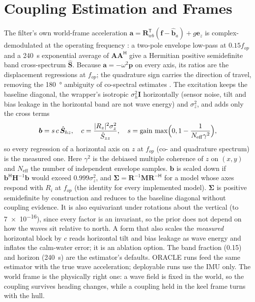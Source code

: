 \documentclass[conference]{IEEEtran}
\DeclareRobustCommand{\vct}[1]{\bm{#1}}
\DeclareRobustCommand{\mat}[1]{\bm{#1}}
\newcommand{\Hr}{^{\mathsf H}}
\theoremstyle{bodysmall}
\begin{document}
\section{Coupling Estimation and Frames}
\label{sec:estimation}
The filter's own world-frame acceleration
$\vct a=\mat R_{wb}^{\mathsf T}(\vct f-\hat{\vct b}_a)+g\vct e_z$ is
complex-demodulated at the operating frequency \cite{bingham67}: a two-pole
envelope low-pass at $0.15f_{op}$ and a \SI{240}{s} exponential average of
$\vct A\vct A\Hr$ give a Hermitian positive semidefinite band cross-spectrum
$\hat{\mat S}$. Because $\vct a=-\omega^2\vct p$ on every axis, its ratios
are the displacement regressions at $f_{op}$; the quadrature sign carries
the direction of travel, removing the \SI{180}{\degree} ambiguity of
co-spectral estimates \cite{longuethiggins63,kuik88}. The excitation keeps
the baseline diagonal, the wrapper's isotropic $\sigma_h^2\mat I$ horizontally
(sensor noise, tilt and bias leakage in the horizontal band are not wave
energy) and $\sigma_z^2$, and adds only the cross terms
\begin{equation}
\vct b=s\,c\,\hat{\mat S}_{hz},\quad c=\frac{|R_z|^2\sigma_z^2}{\hat S_{zz}},\quad
s=\mathrm{gain}\,\max\Bigl(0,1-\frac1{N_{\mathrm{eff}}\gamma^2}\Bigr),
\label{eq:mapping}
\end{equation}
so every regression of a horizontal axis on $z$ at $f_{op}$ (co- and
quadrature spectrum) is the measured one. Here $\gamma^2$ is the debiased
multiple coherence of $z$ on $(x,y)$ and $N_{\mathrm{eff}}$ the number of
independent envelope samples. $\vct b$ is scaled down if
$\vct b\Hr\mat H^{-1}\vct b$ would exceed $0.999\sigma_z^2$, and
$\mat\Sigma=\mat R^{-1}\mat M\mat R^{-\mathsf H}$ for a model whose axes
respond with $R_i$ at $f_{op}$ (the identity for every implemented model). $\mat\Sigma$ is positive
semidefinite by construction and reduces to the baseline diagonal without
coupling evidence. It is also equivariant under rotations about the vertical
(to \num{7e-16}), since every factor is an invariant, so the prior does not
depend on how the waves sit relative to north. A form that also scales the
\emph{measured} horizontal block by $c$ reads horizontal tilt and bias
leakage as wave energy and inflates the calm-water error; it is an ablation
option. The band fraction (0.15) and horizon (\SI{240}{s}) are the
estimator's defaults. ORACLE runs feed the same
estimator with the true wave acceleration; deployable runs use the IMU only.
The world frame is the physically right one: a wave field is fixed in the
world, so the coupling survives heading changes, while a coupling held in
the keel frame turns with the hull.
\end{document}
